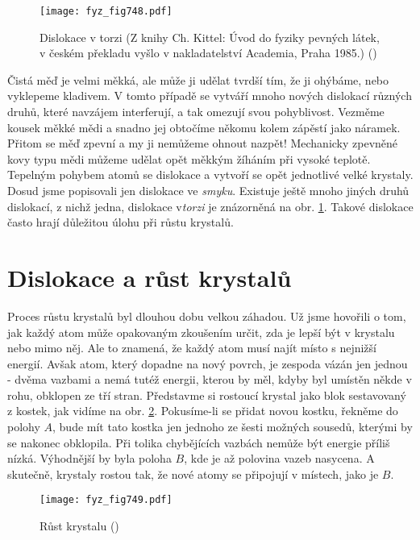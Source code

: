     \begin{figure}[ht!] %
      \centering
      \texttt{[image: fyz\_fig748.pdf]}
      \caption{Dislokace v torzi (Z knihy Ch. Kittel: Úvod do fyziky pevných látek, v českém 
               překladu vyšlo v nakladatelství Academia, Praha 1985.)
               (\cite[s.~554]{Feynman02})}
      \label{fyz:fig748}
    \end{figure}
    
    Čistá měď je velmi měkká, ale může ji udělat tvrdší tím, že ji ohýbáme, nebo vyklepeme 
    kladivem. V tomto případě se vytváří mnoho nových dislokací různých druhů, které navzájem 
    interferují, a tak omezují svou pohyblivost. Vezměme kousek měkké mědi a snadno jej obtočíme 
    někomu kolem zápěstí jako náramek. Přitom se měď zpevní a my ji nemůžeme ohnout nazpět! 
    Mechanicky zpevněné kovy typu mědi můžeme udělat opět měkkým žíháním při vysoké teplotě. 
    Tepelným pohybem atomů se  dislokace a vytvoří se opět jednotlivé velké krystaly. 
    Dosud jsme popisovali jen dislokace ve \emph{smyku}. Existuje ještě mnoho jiných druhů 
    dislokací, z nichž jedna, dislokace v\emph{torzi} je znázorněná na obr. \ref{fyz:fig748}. 
    Takové dislokace často hrají důležitou úlohu při růstu krystalů. 
    
  \section{Dislokace a růst krystalů}\label{fyz:IIchapXXXsecVIII}
    Proces růstu krystalů byl dlouhou dobu velkou záhadou. Už jsme hovořili o tom, jak každý atom 
    může opakovaným zkoušením určit, zda je lepší být v krystalu nebo mimo něj. Ale to znamená, že 
    každý atom musí najít místo s nejnižší energií. Avšak atom, který dopadne na nový povrch, je 
    zespoda vázán jen jednou - dvěma vazbami a nemá tutéž energii, kterou by měl, kdyby byl umístěn 
    někde v rohu, obklopen ze tří stran. Představme si rostoucí krystal jako blok sestavovaný z 
    kostek, jak vidíme na obr. \ref{fyz:fig749}. Pokusíme-li se přidat novou kostku, řekněme do 
    polohy \(A\), bude mít tato kostka jen jednoho ze šesti možných sousedů, kterými by se nakonec 
    obklopila. Při tolika chybějících vazbách nemůže být energie příliš nízká. Výhodnější by byla 
    poloha \(B\), kde je až polovina vazeb nasycena. A skutečně, krystaly rostou tak, že nové atomy 
    se připojují v místech, jako je \(B\).
    
    \begin{figure}[ht!] %
      \centering
      \texttt{[image: fyz\_fig749.pdf]}
      \caption{Růst krystalu
               (\cite[s.~555]{Feynman02})}
      \label{fyz:fig749}
    \end{figure}

